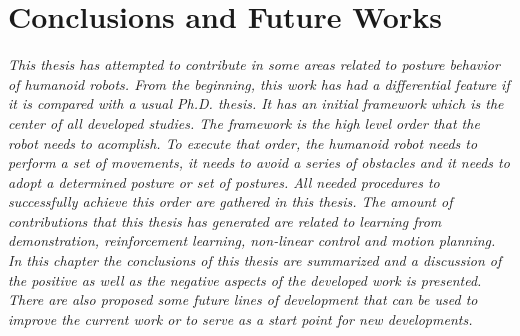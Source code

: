 \chapter{Conclusions and Future Works}\label{ch_conclusions}
\textit{ This thesis has attempted to contribute in some areas related to  posture behavior of humanoid robots.  From the beginning, this work has had a differential feature if it is compared with a usual Ph.D. thesis. It has an initial framework which is the center of all  developed studies. The framework is the high level order  \robotorder that the robot needs to acomplish. To execute that order, the humanoid robot needs to perform a set of  movements, it needs to avoid a series of obstacles and it needs to adopt a determined posture or set of postures. All needed procedures to successfully achieve this order are gathered in this thesis. The amount of contributions that this thesis has generated are related to learning from demonstration, reinforcement learning, non-linear control and motion planning. In this chapter the conclusions of this thesis are summarized and a discussion of the positive  as well as the negative aspects of the developed work is presented. There are also proposed some future lines of development that can be used to improve the current work or to serve as a start point for new developments. }
\newpage











